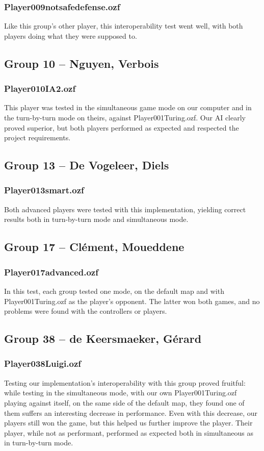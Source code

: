 \documentclass[12pt,journal]{IEEEtran}
\newcommand{\ntt}{\normalfont\ttfamily}
\newcommand{\fn}[1]{{\protect\ntt#1}}
\begin{document}
\subsubsection{\fn{Player009notsafedefense.ozf}}
Like this group's other player, this interoperability test went well, with both players doing what they were supposed to.

\subsection{Group 10 -- Nguyen, Verbois}
\subsubsection{\fn{Player010IA2.ozf}}
This player was tested in the simultaneous game mode on our computer and in the turn-by-turn mode on theirs, against \fn{Player001Turing.ozf}.
Our AI clearly proved superior, but both players performed as expected and respected the project requirements.

\subsection{Group 13 -- De Vogeleer, Diels}
\subsubsection{\fn{Player013smart.ozf}}
Both advanced players were tested with this implementation, yielding correct results both in turn-by-turn mode and simultaneous mode.

\subsection{Group 17 -- Clément, Moueddene}
\subsubsection{\fn{Player017advanced.ozf}}
In this test, each group tested one mode, on the default map and with \fn{Player001Turing.ozf} as the player's opponent.
The latter won both games, and no problems were found with the controllers or players.

\subsection{Group 38 -- de Keersmaeker, Gérard}
\subsubsection{\fn{Player038Luigi.ozf}}
Testing our implementation's interoperability with this group proved fruitful: while testing in the simultaneous mode, with our own \fn{Player001Turing.ozf} playing against itself, on the same side of the default map, they found one of them suffers an interesting decrease in performance.
Even with this decrease, our players still won the game, but this helped us further improve the player.
Their player, while not as performant, performed as expected both in simultaneous as in turn-by-turn mode.
\end{document}
